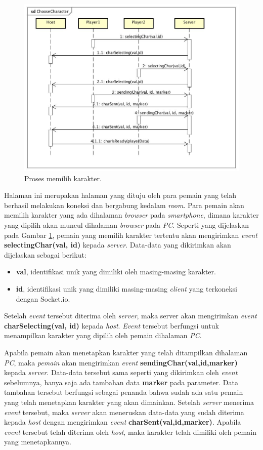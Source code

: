 \begin{figure}[H]
	\centering
	\includegraphics[scale=0.38]{Gambar/ChooseCharacter}
	\caption{Proses memilih karakter.}
	\label{fig:2_ChooseCharacter}
\end{figure}

Halaman ini merupakan halaman yang dituju oleh para pemain yang telah berhasil melakukan koneksi dan bergabung kedalam \textit{room}. Para pemain akan memilih karakter yang ada dihalaman \textit{browser} pada \textit{smartphone}, dimana karakter yang dipilih akan muncul dihalaman \textit{browser} pada \textit{PC}. Seperti yang dijelaskan pada Gambar \ref{fig:2_ChooseCharacter}, pemain yang memilih karakter tertentu akan mengirimkan \textit{event} \textbf{selectingChar(val, id)} kepada \textit{server}. Data-data yang dikirimkan akan dijelaskan sebagai berikut:
\begin{itemize}
	\item \textbf{val}, identifikasi unik yang dimiliki oleh masing-masing karakter.
	\item \textbf{id}, identifikasi unik yang dimiliki masing-masing \textit{client} yang terkoneksi dengan Socket.io.
\end{itemize}
Setelah \textit{event} tersebut diterima oleh \textit{server}, maka server akan mengirimkan \textit{event} \textbf{charSelecting(val, id)} kepada \textit{host}. \textit{Event} tersebut berfungsi untuk menampilkan karakter yang dipilih oleh pemain dihalaman \textit{PC}.

Apabila pemain akan menetapkan karakter yang telah ditampilkan dihalaman \textit{PC}, maka \textit{pemain} akan mengirimkan \textit{event} \textbf{sendingChar(val,id,marker)} kepada \textit{server}. Data-data tersebut sama seperti yang dikirimkan oleh \textit{event} sebelumnya, hanya saja ada tambahan data \textbf{marker} pada parameter. Data tambahan tersebut berfungsi sebagai penanda bahwa sudah ada satu pemain yang telah menetapkan karakter yang akan dimainkan. Setelah \textit{server} menerima \textit{event} tersebut, maka \textit{server} akan meneruskan data-data yang sudah diterima kepada \textit{host} dengan mengirimkan \textit{event} \textbf{charSent(val,id,marker)}. Apabila \textit{event} tersebut telah diterima oleh \textit{host}, maka karakter telah dimiliki oleh pemain yang menetapkannya.

